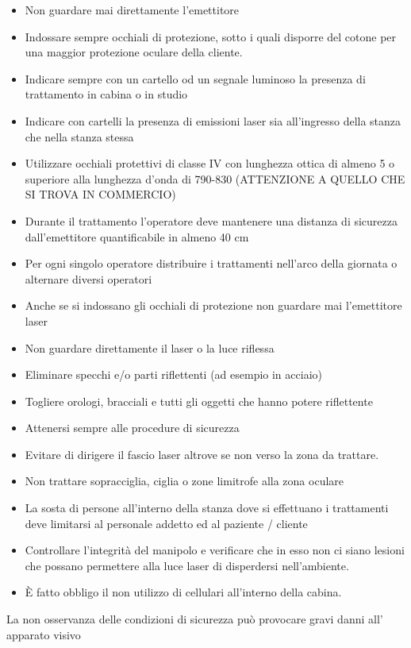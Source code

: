 \documentclass[10pt]{article}
\begin{document}
\begin{itemize}
  \item Non guardare mai direttamente l'emettitore
  \item Indossare sempre occhiali di protezione, sotto i quali disporre del cotone per una maggior protezione oculare della cliente.
  \item Indicare sempre con un cartello od un segnale luminoso la presenza di trattamento in cabina o in studio
  \item Indicare con cartelli la presenza di emissioni laser sia all'ingresso della stanza che nella stanza stessa
  \item Utilizzare occhiali protettivi di classe IV con lunghezza ottica di almeno 5 o superiore alla lunghezza d'onda di 790-830 (ATTENZIONE A QUELLO CHE SI TROVA IN COMMERCIO)
  \item Durante il trattamento l'operatore deve mantenere una distanza di sicurezza dall'emettitore quantificabile in almeno 40 cm
  \item Per ogni singolo operatore distribuire i trattamenti nell'arco della giornata o alternare diversi operatori
  \item Anche se si indossano gli occhiali di protezione non guardare mai l'emettitore laser
  \item Non guardare direttamente il laser o la luce riflessa
  \item Eliminare specchi e/o parti riflettenti (ad esempio in acciaio)
  \item Togliere orologi, bracciali e tutti gli oggetti che hanno potere riflettente
  \item Attenersi sempre alle procedure di sicurezza
  \item Evitare di dirigere il fascio laser altrove se non verso la zona da trattare.
  \item Non trattare sopracciglia, ciglia o zone limitrofe alla zona oculare
  \item La sosta di persone all'interno della stanza dove si effettuano i trattamenti deve limitarsi al personale addetto ed al paziente / cliente
  \item Controllare l'integrità del manipolo e verificare che in esso non ci siano lesioni che possano permettere alla luce laser di disperdersi nell'ambiente.
  \item È fatto obbligo il non utilizzo di cellulari all'interno della cabina.
\end{itemize}

La non osservanza delle condizioni di sicurezza può provocare gravi danni all' apparato visivo
\end{document}
